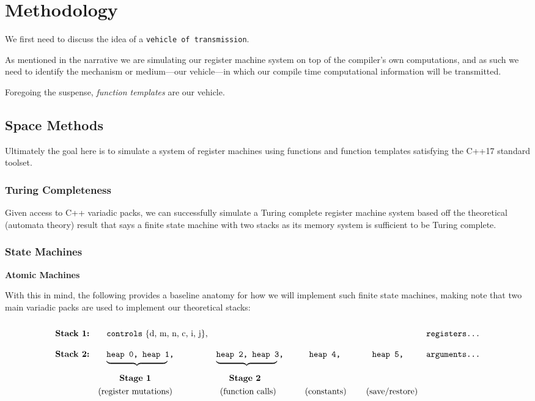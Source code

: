 \documentclass[twoside]{article}
\newcommand{\strong}[1]{{\bfseries #1}}
\newcommand{\bfmbox}[1]{\mbox{\bfseries #1}}
\newcommand{\tab}[1][1.125cm]{\hspace{#1}}
\newcommand{\col}[1][0ex]{& \hspace{#1}}
\begin{document}
\section*{Methodology}

We first need to discuss the idea of a \texttt{vehicle of transmission}.

As mentioned in the narrative we are simulating our register machine system on top of the compiler's own computations,
and as such we need to identify the mechanism or medium---our vehicle---in which our compile time computational
information will be transmitted.

Foregoing the suspense, \emph{function templates} are our vehicle.

\subsection*{Space Methods}

Ultimately the goal here is to simulate a system of register machines using functions and function templates
satisfying the C++17 standard toolset.

\subsubsection*{Turing Completeness}

Given access to C++ variadic packs, we can successfully simulate a Turing complete register machine system based off the
theoretical (automata theory) result that says a finite state machine with two stacks as its memory system is sufficient
to be Turing complete.

\subsubsection*{State Machines}

\strong{Atomic Machines}

With this in mind, the following provides a baseline anatomy for how we will implement such finite
state machines, making note that two main variadic packs are used to implement our theoretical stacks:

$$ \def\arraystretch{2}
\tab[0cm] \begin{array}{lllllll}
\bfmbox{Stack 1:} \col[1em]   \texttt{controls}\mbox{ \{d, m, n, c, i, j\},}     \col\col\col\col   \texttt{registers\ldots} \\
\bfmbox{Stack 2:} \col[1em]   \texttt{heap 0, heap 1,}  \col        \texttt{heap 2, heap 3,}
		  \col[2em]   \texttt{heap 4,}          \col[2em]   \texttt{heap 5,}     \col       \texttt{arguments\ldots} \\[-2em]
		  \col[1em]   \underbrace{\tab[2.5cm]}  \col        \underbrace{\tab[2.5cm]}				     \\
		  \col[2.5em] \bfmbox{Stage 1}          \col[1.5em] \bfmbox{Stage 2}					     \\[-2ex]
		  \col      \mbox{(register mutations)} \col[1ex] \mbox{(function calls)} \col[1.5em] \mbox{(constants)}
		  \col[3ex] \mbox{(save/restore)}
\end{array} $$
\end{document}
